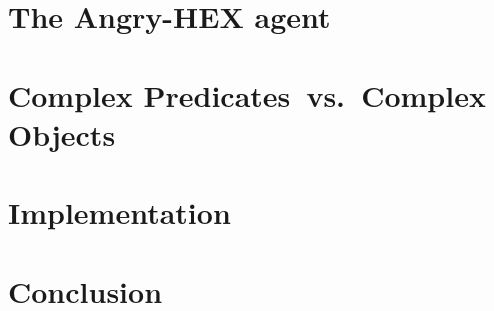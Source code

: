 \documentclass{llncs}
\newcommand{\ah}{Angry-HEX\xspace}
\begin{document}
\section{The \ah agent}
\label{sec:agent}


\section{Complex Predicates~vs.~Complex Objects}
\label{sec:main}


\section{Implementation}
\label{sec:impl}

\section{Conclusion}
\label{sec:conc}


\end{document}
